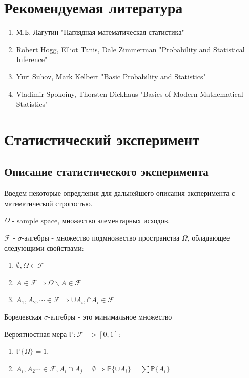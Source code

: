 \documentclass[a4 paper]{article}
\begin{document}

\section{Рекомендуемая литература}
\begin{enumerate}
    \item М.Б. Лагутин "Наглядная математическая статистика"
    \item Robert Hogg, Elliot Tanis, Dale Zimmerman "Probability and Statistical Inference"
    \item Yuri Suhov, Mark Kelbert "Basic Probability and Statistics" 
    \item Vladimir Spokoiny, Thorsten Dickhaus "Basics of Modern Mathematical Statistics" 
\end{enumerate}

\section{Статистический эксперимент}

\subsection{Описание статистического эксперимента}
Введем некоторые опредления для дальнейшего описания эксперимента с математической строгостью.
\begin{defin}
$\Omega$ - sample space, множество элементарных исходов.
\end{defin}
\begin{defin}
$\mathcal{F}$ - $\sigma$-алгебры - множество подмножество пространства $\Omega$, обладающее следующими свойствами:
\begin{enumerate}
    \item $\emptyset, \Omega \in \mathcal{F}$
    \item $A \in \mathcal{F} \Rightarrow \Omega \backslash A \in \mathcal{F}$
    \item $A_1, A_2, \cdots \in \mathcal{F} \Rightarrow \cup A_i, \cap A_i \in \mathcal{F}$
\end{enumerate}
\end{defin}
\begin{defin}
Борелевская $\sigma$-алгебры - это минимальное множество 
\end{defin}
\begin{defin}
Вероятностная мера $\mathbb{P}: \mathcal{F} -> [0,1]$: 
\begin{enumerate}
    \item $\mathbb{P}\{\Omega\} = 1,$
    \item $A_i, A_2 \cdots \in \mathcal{F}, A_i \cap A_j = \emptyset \Rightarrow \mathbb{P}\{\cup A_i\} = \sum \mathbb{P}\{A_i\}$
\end{enumerate}
\end{defin}
\end{document}
